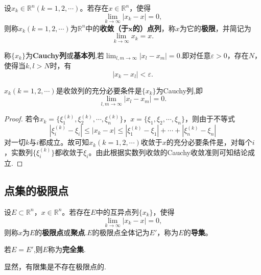 \documentclass[../../main.tex]{subfiles}%
\begin{document}
\begin{definition}
  设\(x_k\in\mathbb{R}^n(k = 1,2,\cdots)\)。若存在\(x\in\mathbb{R}^n\)，使得
\[\lim_{k\rightarrow\infty}|x_k - x| = 0,\]
则称\(x_k(k = 1,2,\cdots)\)为\(\mathbb{R}^n\)中的\textbf{收敛（于\(\boldsymbol{x}\)的）点列}，称\(x\)为它的\textbf{极限}，并简记为
\[\lim_{k\rightarrow\infty}x_k = x.\]
\end{definition}

\begin{definition}[Cauchy列]\label{definition:Cauchy列}
  称\(\{x_k\}\)为\textbf{Cauchy列}或\textbf{基本列},若$\lim_{l,m\rightarrow\infty}|x_l - x_m| = 0$.即对任意\(\varepsilon>0\)，存在\(N\)，使得当\(k,l>N\)时，有
\[|x_k - x_l|<\varepsilon.\]
\end{definition}

\begin{theorem}
  \(x_k(k = 1,2,\cdots)\)是收敛列的充分必要条件是\(\{x_k\}\)为Cauchy列,即
\[\lim_{l,m\rightarrow\infty}|x_l - x_m| = 0.\]
\end{theorem}
\begin{proof}
  若令\(x_k=\{\xi_1^{(k)},\xi_2^{(k)},\cdots,\xi_n^{(k)}\}\)，\(x = \{\xi_1,\xi_2,\cdots,\xi_n\}\)，则由于不等式
\[|\xi_i^{(k)} - \xi_i|\leqslant|x_k - x|\leqslant|\xi_1^{(k)} - \xi_1|+\cdots+|\xi_n^{(k)} - \xi_n|\]
对一切\(k\)与\(i\)都成立。故可知\(x_k(k = 1,2,\cdots)\)收敛于\(x\)的充分必要条件是，对每个\(i\)，实数列\(\{\xi_i^{(k)}\}\)都收敛于\(\xi_i\)。由此根据实数列收敛的Cauchy收敛准则可知结论成立.
\end{proof}

\subsection{点集的极限点}

\begin{definition}\label{definition:极限点、导集与完全集}
设\(E\subset\mathbb{R}^n\)，\(x\in\mathbb{R}^n\)。若存在\(E\)中的互异点列\(\{x_k\}\)，使得
\[\lim_{k\rightarrow\infty}|x_k - x| = 0,\]
则称\(x\)为\(E\)的\textbf{极限点}或\textbf{聚点}.\(E\)的极限点全体记为\(E'\)，称为\(E\)的\textbf{导集}。

若$E = E'$,则$E$称为\textbf{完全集}.
\end{definition}
\begin{note}
显然，有限集是不存在极限点的.
\end{note}
\end{document}
